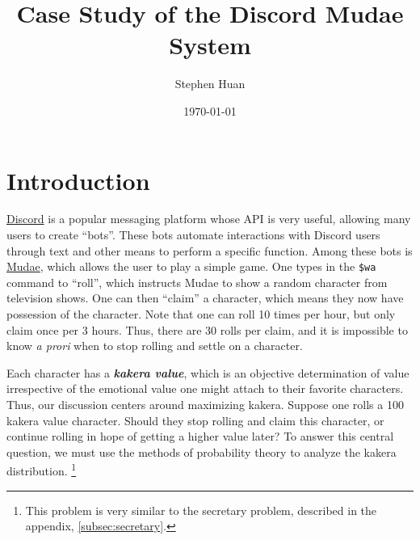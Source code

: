 \documentclass[11pt, oneside]{article}
\title{Case Study of the Discord Mudae System}
\author{Stephen Huan}
\date{\today}
\newcommand{\emphasis}[1]{\textbf{\textit{#1}}}
\theoremstyle{plain}
\theoremstyle{definition}
\begin{document}
\maketitle
\setcounter{tocdepth}{3} %
{\hypersetup{linkcolor=black}
\tableofcontents
\listofalgorithms
}
\newpage

\section{Introduction} \label{sec:intro}
\href{https://discord.com/}{Discord} is a popular messaging platform
whose API is very useful, allowing many users to create \enquote{bots}.
These bots automate interactions with Discord users through text
and other means to perform a specific function. Among these bots is
\href{https://top.gg/bot/432610292342587392}{Mudae}, which allows the
user to play a simple game. One types in the \texttt{\$wa} command to
\enquote{roll}, which instructs Mudae to show a random character from
television shows. One can then \enquote{claim} a character, which means
they now have possession of the character. Note that one can roll 10
times per hour, but only claim once per 3 hours. Thus, there are 30
rolls per claim, and it is impossible to know \textit{a prori} when
to stop rolling and settle on a character.

Each character has a \emphasis{kakera value}, which is an objective
determination of value irrespective of the emotional value one might
attach to their favorite characters. Thus, our discussion centers around
maximizing kakera. Suppose one rolls a 100 kakera value character. Should
they stop rolling and claim this character, or continue rolling in hope of
getting a higher value later? To answer this central question, we must use
the methods of probability theory to analyze the kakera distribution.
\footnote{This problem is very similar to the secretary problem,
described in the appendix, \autoref{subsec:secretary}.}
\end{document}
